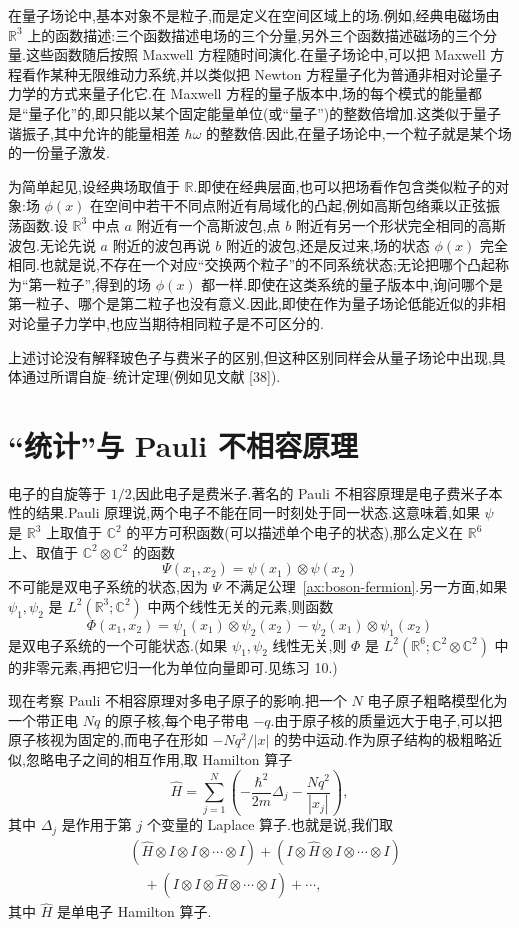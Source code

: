 在量子场论中,基本对象不是粒子,而是定义在空间区域上的场.例如,经典电磁场由 $\mathbb R^3$ 上的函数描述:三个函数描述电场的三个分量,另外三个函数描述磁场的三个分量.这些函数随后按照 Maxwell 方程随时间演化.在量子场论中,可以把 Maxwell 方程看作某种无限维动力系统,并以类似把 Newton 方程量子化为普通非相对论量子力学的方式来量子化它.在 Maxwell 方程的量子版本中,场的每个模式的能量都是“量子化”的,即只能以某个固定能量单位(或“量子”)的整数倍增加.这类似于量子谐振子,其中允许的能量相差 $\hbar\omega$ 的整数倍.因此,在量子场论中,一个粒子就是某个场的一份量子激发.

为简单起见,设经典场取值于 $\mathbb R$.即使在经典层面,也可以把场看作包含类似粒子的对象:场 $\phi(x)$ 在空间中若干不同点附近有局域化的凸起,例如高斯包络乘以正弦振荡函数.设 $\mathbb R^3$ 中点 $a$ 附近有一个高斯波包,点 $b$ 附近有另一个形状完全相同的高斯波包.无论先说 $a$ 附近的波包再说 $b$ 附近的波包,还是反过来,场的状态 $\phi(x)$ 完全相同.也就是说,不存在一个对应“交换两个粒子”的不同系统状态;无论把哪个凸起称为“第一粒子”,得到的场 $\phi(x)$ 都一样.即使在这类系统的量子版本中,询问哪个是第一粒子、哪个是第二粒子也没有意义.因此,即使在作为量子场论低能近似的非相对论量子力学中,也应当期待相同粒子是不可区分的.

上述讨论没有解释玻色子与费米子的区别,但这种区别同样会从量子场论中出现,具体通过所谓自旋--统计定理(例如见文献 [38]).

\section{“统计”与 Pauli 不相容原理}
\label{sec:pauli-exclusion}

电子的自旋等于 $1/2$,因此电子是费米子.著名的 Pauli 不相容原理是电子费米子本性的结果.Pauli 原理说,两个电子不能在同一时刻处于同一状态.这意味着,如果 $\psi$ 是 $\mathbb R^3$ 上取值于 $\mathbb C^2$ 的平方可积函数(可以描述单个电子的状态),那么定义在 $\mathbb R^6$ 上、取值于 $\mathbb C^2\otimes\mathbb C^2$ 的函数
\[
 \Psi(x_1,x_2)=\psi(x_1)\otimes\psi(x_2)
\]
不可能是双电子系统的状态,因为 $\Psi$ 不满足公理~\ref{ax:boson-fermion}.另一方面,如果 $\psi_1,\psi_2$ 是 $L^2(\mathbb R^3;\mathbb C^2)$ 中两个线性无关的元素,则函数
\[
 \Phi(x_1,x_2)
 =\psi_1(x_1)\otimes\psi_2(x_2)
 -\psi_2(x_1)\otimes\psi_1(x_2)\label{eq:two-electron-antisymmetric}
\]
是双电子系统的一个可能状态.(如果 $\psi_1,\psi_2$ 线性无关,则 $\Phi$ 是 $L^2(\mathbb R^6;\mathbb C^2\otimes\mathbb C^2)$ 中的非零元素,再把它归一化为单位向量即可.见练习 10.)

现在考察 Pauli 不相容原理对多电子原子的影响.把一个 $N$ 电子原子粗略模型化为一个带正电 $Nq$ 的原子核,每个电子带电 $-q$.由于原子核的质量远大于电子,可以把原子核视为固定的,而电子在形如 $-Nq^2/|x|$ 的势中运动.作为原子结构的极粗略近似,忽略电子之间的相互作用,取 Hamilton 算子
\[
 \widehat H=\sum_{j=1}^N\left(-\frac{\hbar^2}{2m}\Delta_j-\frac{Nq^2}{|x_j|}\right),\label{eq:multi-electron-hamiltonian}
\]
其中 $\Delta_j$ 是作用于第 $j$ 个变量的 Laplace 算子.也就是说,我们取
\[
\begin{aligned}
 &(\widehat H\otimes I\otimes I\otimes\cdots\otimes I)
 +(I\otimes\widehat H\otimes I\otimes\cdots\otimes I)\\
 &\quad +(I\otimes I\otimes\widehat H\otimes\cdots\otimes I)+\cdots,
\end{aligned}
\]
其中 $\widehat H$ 是单电子 Hamilton 算子.

